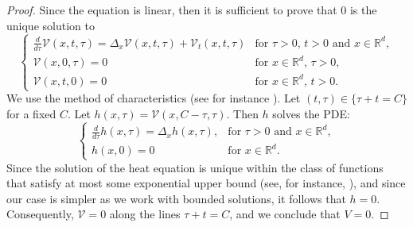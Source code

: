 \documentclass[11pt, twoside, notitlepage]{amsart}
\newcommand\R{\mathbb{R}}
\numberwithin{equation}{section}
\begin{document}
\begin{proof}
  Since the equation is linear, then it is sufficient to prove that $0$ is the unique solution to
    \begin{equation*} %
  \left\{ \begin{array}{ll}
 \displaystyle \frac{d}{d\tau}\mathcal{V}(x,t,\tau)=\Delta_{x} \mathcal{V}(x,t,\tau) +  \mathcal{V}_t(x,t,\tau) &\text{for }\tau>0,\, t >0 \text{ and } x \in \R^d,  \\[3mm]
  \mathcal{V}(x,0,\tau)= 0  &\text{for } x \in \R^d, \, \tau>0, \\[1mm]
  \mathcal{V}(x,t,0)=0 &\text{for } x \in \R^d, \, t>0.
    \end{array}
    \right.
\end{equation*}
%
We use the method of characteristics (see for instance \cite[Ch.1]{Fritz-John}). Let $(t,\tau) \in \{ \tau +t =C \} $  for a fixed $C$.  Let $h(x,\tau)= \mathcal{V}(x,C-\tau, \tau).$ Then $h$ solves the PDE:
 \begin{equation*}
  \left\{ \begin{array}{ll}
\displaystyle \frac{d}{d\tau}h(x,\tau)  = \Delta_x h(x,\tau),  &\text{for }\tau>0 \text{ and } x \in \R^d,  \\[3mm]
 h(x,0)= 0  &\text{for } x \in \R^d.
    \end{array}
    \right.
\end{equation*}
Since the solution of the heat equation is unique within the class of functions that satisfy at most some exponential upper bound  (see, for instance, \cite{Evans}), and since our case is simpler as we work with bounded solutions, it follows that $h=0$. Consequently, $\mathcal{V}=0$ along the lines $\tau +t =C$, and we conclude that $V=0$.
\end{proof}
\end{document}
